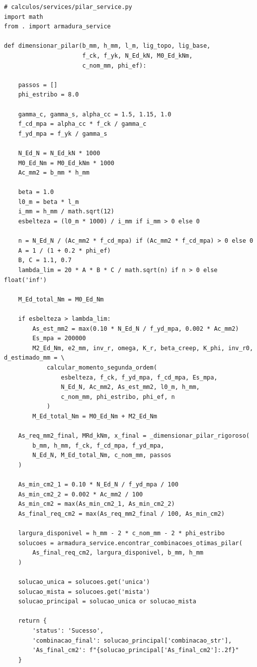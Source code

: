 \newpage
\begin{lstlisting}[style=PythonStyle, basicstyle=\ttfamily\normalsize, caption={Excerto de pilar\_service.py (Dimensionamento principal)}, label={lst:pilar_service}]
# calculos/services/pilar_service.py
import math
from . import armadura_service

def dimensionar_pilar(b_mm, h_mm, l_m, lig_topo, lig_base,
                      f_ck, f_yk, N_Ed_kN, M0_Ed_kNm,
                      c_nom_mm, phi_ef):

    passos = []
    phi_estribo = 8.0

    gamma_c, gamma_s, alpha_cc = 1.5, 1.15, 1.0
    f_cd_mpa = alpha_cc * f_ck / gamma_c
    f_yd_mpa = f_yk / gamma_s

    N_Ed_N = N_Ed_kN * 1000
    M0_Ed_Nm = M0_Ed_kNm * 1000
    Ac_mm2 = b_mm * h_mm

    beta = 1.0
    l0_m = beta * l_m
    i_mm = h_mm / math.sqrt(12)
    esbelteza = (l0_m * 1000) / i_mm if i_mm > 0 else 0

    n = N_Ed_N / (Ac_mm2 * f_cd_mpa) if (Ac_mm2 * f_cd_mpa) > 0 else 0
    A = 1 / (1 + 0.2 * phi_ef)
    B, C = 1.1, 0.7
    lambda_lim = 20 * A * B * C / math.sqrt(n) if n > 0 else float('inf')

    M_Ed_total_Nm = M0_Ed_Nm

    if esbelteza > lambda_lim:
        As_est_mm2 = max(0.10 * N_Ed_N / f_yd_mpa, 0.002 * Ac_mm2)
        Es_mpa = 200000
        M2_Ed_Nm, e2_mm, inv_r, omega, K_r, beta_creep, K_phi, inv_r0, d_estimado_mm = \
            calcular_momento_segunda_ordem(
                esbelteza, f_ck, f_yd_mpa, f_cd_mpa, Es_mpa,
                N_Ed_N, Ac_mm2, As_est_mm2, l0_m, h_mm,
                c_nom_mm, phi_estribo, phi_ef, n
            )
        M_Ed_total_Nm = M0_Ed_Nm + M2_Ed_Nm

    As_req_mm2_final, MRd_kNm, x_final = _dimensionar_pilar_rigoroso(
        b_mm, h_mm, f_ck, f_cd_mpa, f_yd_mpa,
        N_Ed_N, M_Ed_total_Nm, c_nom_mm, passos
    )

    As_min_cm2_1 = 0.10 * N_Ed_N / f_yd_mpa / 100
    As_min_cm2_2 = 0.002 * Ac_mm2 / 100
    As_min_cm2 = max(As_min_cm2_1, As_min_cm2_2)
    As_final_req_cm2 = max(As_req_mm2_final / 100, As_min_cm2)

    largura_disponivel = h_mm - 2 * c_nom_mm - 2 * phi_estribo
    solucoes = armadura_service.encontrar_combinacoes_otimas_pilar(
        As_final_req_cm2, largura_disponivel, b_mm, h_mm
    )

    solucao_unica = solucoes.get('unica')
    solucao_mista = solucoes.get('mista')
    solucao_principal = solucao_unica or solucao_mista

    return {
        'status': 'Sucesso',
        'combinacao_final': solucao_principal['combinacao_str'],
        'As_final_cm2': f"{solucao_principal['As_final_cm2']:.2f}"
    }
\end{lstlisting}

